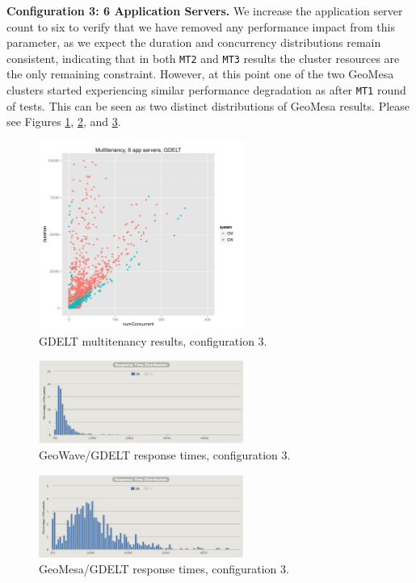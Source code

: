 {\bf Configuration 3: 6 Application Servers.}
We increase the application server count to six to verify that we have removed any performance impact from this parameter,
as we expect the duration and concurrency distributions remain consistent, indicating that in both \texttt{MT2} and \texttt{MT3} results the cluster resources are the only remaining constraint.
However, at this point one of the two GeoMesa clusters started experiencing similar performance degradation as after \texttt{MT1} round of tests.
This can be seen as two distinct distributions of GeoMesa results.
Please see Figures \ref{config3}, \ref{config3distrogw}, and \ref{config3distrogm}.

\begin{figure}[h!tb]
  \centering
  \includegraphics[width=0.60\textwidth]{../docs/img/multitenancy/graph_100k_mt3.png}
  \caption{GDELT multitenancy results, configuration 3.}
  \label{config3}
\end{figure}

\begin{figure}[h!tb]
  \centering
  \includegraphics[width=0.60\textwidth]{images/mt3-2-gw.png}
  \caption{GeoWave/GDELT response times, configuration 3.}
  \label{config3distrogw}
\end{figure}

\begin{figure}[h!tb]
  \centering
  \includegraphics[width=0.60\textwidth]{images/mt3-2-gm.png}
  \caption{GeoMesa/GDELT response times, configuration 3.}
  \label{config3distrogm}
\end{figure}


